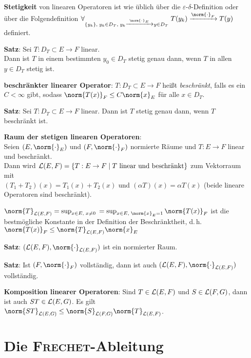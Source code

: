 \textbf{Stetigkeit} von linearen Operatoren ist wie üblich über die
$\varepsilon$-$\delta$-Definition oder über die Folgendefinition
$\forall_{\{y_k\},\; y_k \in D_T,\;
y_k \xrightarrow{\norm{\cdot}_E} y \in D_T}\;
T(y_k) \xrightarrow{\norm{\cdot}_F} T(y)$ definiert.

\textbf{Satz}: Sei $T: D_T \subset E \rightarrow F$ linear. \\
Dann ist $T$ in einem bestimmten $y_0 \in D_T$ stetig genau dann,
wenn $T$ in allen $y \in D_T$ stetig ist.

\textbf{beschränkter linearer Operator}:
$T: D_T \subset E \rightarrow F$ heißt \emph{beschränkt},
falls es ein $C < \infty$ gibt, sodass
$\norm{T(x)}_F \le C \norm{x}_E$ für alle $x \in D_T$.

\textbf{Satz}:
Sei $T: D_T \subset E \rightarrow F$ linear.
Dann ist $T$ stetig genau dann, wenn $T$ beschränkt ist.

\linie

\textbf{Raum der stetigen linearen Operatoren}: \\
Seien $(E, \norm{\cdot}_E)$ und $(F, \norm{\cdot}_F)$ normierte Räume
und $T: E \rightarrow F$ linear und beschränkt. \\
Dann wird $\mathcal{L}(E,F) =
\{T: E \rightarrow F \;|\; T \text{ linear und beschränkt}\}$
zum Vektorraum mit \\
$(T_1 + T_2)(x) = T_1(x) + T_2(x)$ und
$(\alpha T)(x) = \alpha T(x)$ (beide lineare Operatoren sind beschränkt).

$\norm{T}_{\L(E,F)} = \sup_{x \in E,\; x \not= 0}$
$= \sup_{x \in E,\; \norm{x}_E = 1} \norm{T(x)}_F$
ist die bestmögliche Konstante in der Definition der Beschränktheit,
d.\,h. $\norm{T(x)}_F \le \norm{T}_{\L(E,F)} \norm{x}_E$

\textbf{Satz}:
$(\L(E,F), \norm{\cdot}_{\L(E,F)})$ ist ein normierter Raum.

\textbf{Satz}:
Ist $(F, \norm{\cdot}_F)$ vollständig, dann ist auch
$(\L(E,F), \norm{\cdot}_{\L(E,F)})$ vollständig.

\linie

\textbf{Komposition linearer Operatoren}:
Sind $T \in \mathcal{L}(E,F)$ und $S \in \mathcal{L}(F,G)$, dann ist
auch $ST \in \mathcal{L}(E,G)$.
Es gilt $\norm{ST}_{\L(E,G)} \le \norm{S}_{\L(F,G)} \norm{T}_{\L(E,F)}$.

\section{%
    Die \textsc{Frechet}-Ableitung%
}

